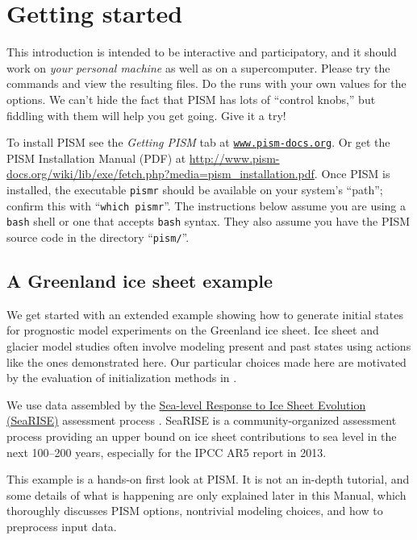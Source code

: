 \section{Getting started}\label{sec:start}

This introduction is intended to be interactive and participatory, and it should work on \emph{your personal machine} as well as on a supercomputer.  Please try the commands and view the resulting files.  Do the runs with your own values for the options.  We can't hide the fact that PISM has lots of ``control knobs,'' but fiddling with them will help you get going.  Give it a try!

To install PISM see the \emph{Getting PISM} tab at \href{http://www.pism-docs.org}{\texttt{www.pism-docs.org}}.  Or get the PISM Installation Manual (PDF) at \url{http://www.pism-docs.org/wiki/lib/exe/fetch.php?media=pism_installation.pdf}.  Once PISM is installed, the executable \texttt{pismr} should be available on your system's ``path''; confirm this with ``\texttt{which pismr}''.  The instructions below assume you are using a \texttt{bash} shell or one that accepts \texttt{bash} syntax.  They also assume you have the PISM source code in the directory ``\texttt{pism/}''.

\subsection{A Greenland ice sheet example}

We get started with an extended example showing how to generate initial states for prognostic model experiments on the Greenland ice sheet.  Ice sheet and glacier model studies often involve modeling present and past states using actions like the ones demonstrated here.  Our particular choices made here are motivated by the evaluation of initialization methods in \cite{AschwandenAdalgeirsdottirKhroulev}.

We use data assembled by the \href{http://websrv.cs.umt.edu/isis/index.php/SeaRISE_Assessment}{Sea-level Response to Ice Sheet Evolution (SeaRISE)} assessment process \cite{Bindschadler2013SeaRISE}.  SeaRISE is a community-organized assessment process providing an upper bound on ice sheet contributions to sea level in the next 100--200 years, especially for the IPCC AR5 report in 2013.

This example is a hands-on first look at PISM.  It is not an in-depth tutorial, and some details of what is happening are only explained later in this Manual, which thoroughly discusses PISM options, nontrivial modeling choices, and how to preprocess input data.

